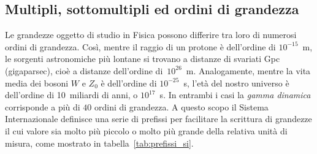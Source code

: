 \subsection{Multipli, sottomultipli ed ordini di grandezza}

Le grandezze oggetto di studio in Fisica possono differire tra loro di
numerosi ordini di grandezza. Così, mentre il raggio di un protone è
dell'ordine di $10^{-15}$~m, le sorgenti astronomiche più lontane si
trovano a distanze di svariati Gpc (gigaparsec), cioè a distanze dell'ordine
di~$10^{26}$~m.
Analogamente, mentre la vita media dei bosoni $W$ e $Z_0$ è dell'ordine di
$10^{-25}$~s, l'età del nostro universo è dell'ordine di 10~miliardi di
anni, o $10^{17}$~s. In entrambi i casi la \emph{gamma dinamica} corrisponde a
più di $40$ ordini di grandezza.
A questo scopo il Sistema Internazionale definisce una serie di prefissi
per facilitare la scrittura di grandezze il cui valore sia molto più piccolo
o molto più grande della relativa unità di misura, come mostrato in
tabella~\ref{tab:prefissi_si}.

\begin{table}[!htb]
\end{table}

